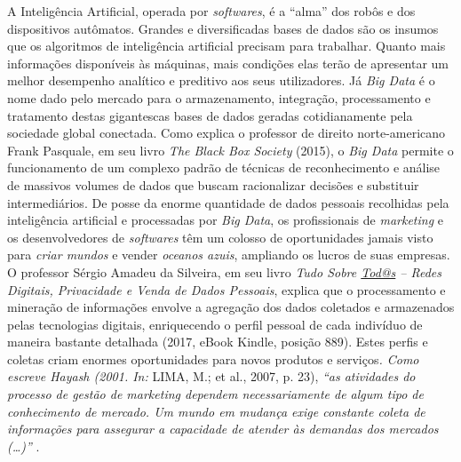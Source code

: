 A Inteligência Artificial, operada por \emph{softwares}, é a ``alma''
dos robôs e dos dispositivos autômatos. Grandes e diversificadas bases
de dados são os insumos que os algoritmos de inteligência artificial
precisam para trabalhar. Quanto mais informações disponíveis às
máquinas, mais condições elas terão de apresentar um melhor desempenho
analítico e preditivo aos seus utilizadores. Já \emph{Big Data} é o nome
dado pelo mercado para o armazenamento, integração, processamento e
tratamento destas gigantescas bases de dados geradas cotidianamente pela
sociedade global conectada. Como explica o professor de direito
norte-americano Frank Pasquale, em seu livro \emph{The Black Box
Society} (2015), o \emph{Big Data} permite o funcionamento de um
complexo padrão de técnicas de reconhecimento e análise de massivos
volumes de dados que buscam racionalizar decisões e substituir
intermediários. De posse da enorme quantidade de dados pessoais
recolhidas pela inteligência artificial e processadas por \emph{Big
Data}, os profissionais de \emph{marketing} e os desenvolvedores de
\emph{softwares} têm um colosso de oportunidades jamais visto para
\emph{criar mundos} e vender \emph{oceanos azuis}, ampliando os lucros
de suas empresas. O professor Sérgio Amadeu da Silveira, em seu livro
\emph{Tudo Sobre \href{mailto:Tod@s}{\emph{Tod@s}} -- Redes Digitais,
Privacidade e Venda de Dados Pessoais}, explica que o processamento e
mineração de informações envolve a agregação dos dados coletados e
armazenados pelas tecnologias digitais, enriquecendo o perfil pessoal de
cada indivíduo de maneira bastante detalhada (2017, eBook Kindle,
posição 889). Estes perfis e coletas criam enormes oportunidades para
novos produtos e serviços\emph{. Como escreve Hayash (2001. In:} LIMA,
M.; et al., 2007, p. 23), \emph{``as atividades do processo de gestão de
marketing dependem necessariamente de algum tipo de conhecimento de
mercado. Um mundo em mudança exige constante coleta de informações para
assegurar a capacidade de atender às demandas dos mercados (\ldots{})''}
.

